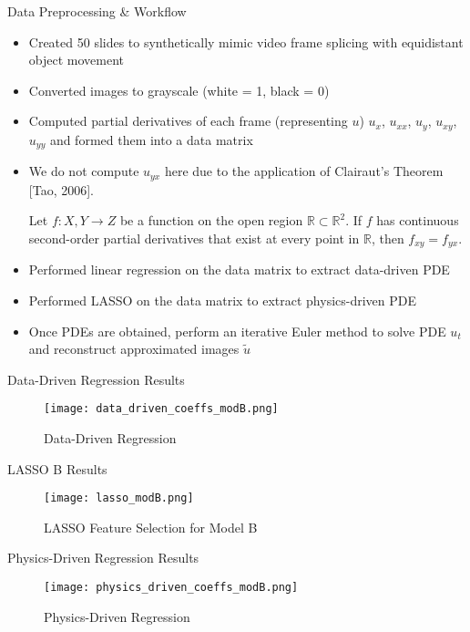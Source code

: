 \documentclass[aspectratio=169,xcolor=dvipsnames]{beamer}
\begin{document}
\begin{frame}{Data Preprocessing \& Workflow}
\begin{itemize}
        \item Created 50 slides to synthetically mimic video frame splicing with equidistant object movement
        \item Converted images to grayscale (white = 1, black = 0)
        \item Computed partial derivatives of each frame (representing $u$) $u_{x}$, $u_{xx}$, $u_{y}$, $u_{xy}$, $u_{yy}$ and formed them into a data matrix
        \item We do not compute $u_{yx}$ here due to the application of Clairaut's Theorem [Tao, 2006].
        \begin{theorem}
        Let $f: X, Y \rightarrow Z$ be a function on the open region $\mathbb{R} \subset \mathbb{R}^2$. If $f$ has continuous second-order partial derivatives that exist at every point in $\mathbb{R}$, then $f_{xy} = f_{yx}$.
        \end{theorem}
        \item Performed linear regression on the data matrix to extract data-driven PDE
        \item Performed LASSO on the data matrix to extract physics-driven PDE
        \item Once PDEs are obtained, perform an iterative Euler method to solve PDE $u_{t}$ and reconstruct approximated images $\tilde{u}$
    \end{itemize}
\end{frame}

\begin{frame}{Data-Driven Regression Results}
    \begin{figure}
        \centering
        \texttt{[image: data\_driven\_coeffs\_modB.png]}
        \caption{Data-Driven Regression}
        \label{fig:data_driven_regB}
    \end{figure}
\end{frame}

\begin{frame}{LASSO B Results}
    \begin{figure}
        \centering
        \texttt{[image: lasso\_modB.png]}
        \caption{LASSO Feature Selection for Model B}
        \label{fig:lasso_B}
    \end{figure}
\end{frame}

\begin{frame}{Physics-Driven Regression Results}
    \begin{figure}
        \centering
        \texttt{[image: physics\_driven\_coeffs\_modB.png]}
        \caption{Physics-Driven Regression}
        \label{fig:physics_driven_regB}
    \end{figure}
\end{frame}
\end{document}
